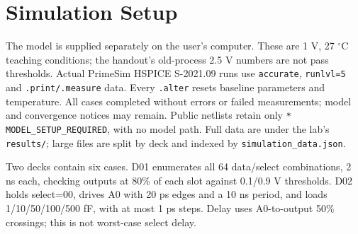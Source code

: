 \section{Simulation Setup}
The model is supplied separately on the user's computer. These are 1 V, 27 $^\circ$C teaching conditions; the handout's old-process 2.5 V numbers are not pass thresholds. Actual PrimeSim HSPICE S-2021.09 runs use \texttt{accurate}, \texttt{runlvl=5} and \texttt{.print/.measure} data. Every \texttt{.alter} resets baseline parameters and temperature. All cases completed without errors or failed measurements; model and convergence notices may remain. Public netlists retain only \texttt{* MODEL\_SETUP\_REQUIRED}, with no model path. Full data are under the lab's \texttt{results/}; large files are split by deck and indexed by \texttt{simulation\_data.json}.

Two decks contain six cases. D01 enumerates all 64 data/select combinations, 2 ns each, checking outputs at 80\% of each slot against 0.1/0.9 V thresholds. D02 holds select=00, drives A0 with 20 ps edges and a 10 ns period, and loads 1/10/50/100/500 fF, with at most 1 ps steps. Delay uses A0-to-output 50\% crossings; this is not worst-case select delay.

